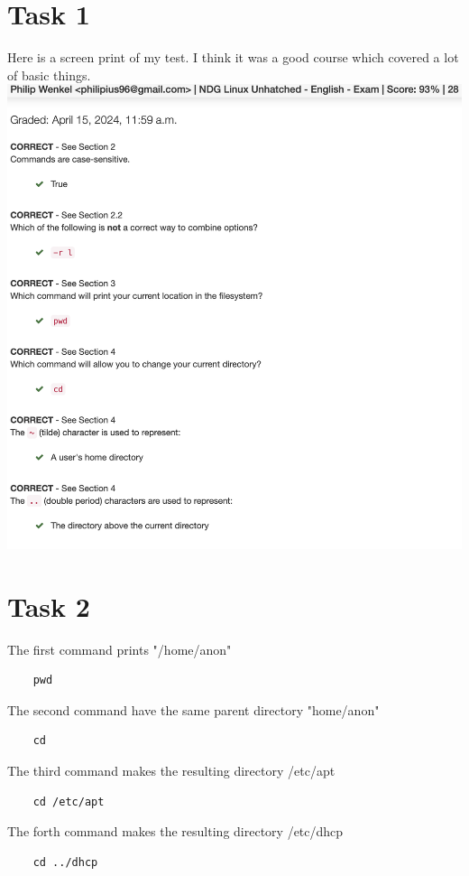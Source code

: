 \documentclass{article}
\begin{document}
\section {Task 1}
Here is a screen print of my test. 
I think it was a good course which covered a lot of basic things.
\includegraphics[width=\textwidth,height=\textheight,keepaspectratio]{quiz}

\section{Task 2}
The first command prints "/home/anon"
\begin{verbatim}
	pwd
\end{verbatim}

The second command have the same parent directory "home/anon"
\begin{verbatim}
	cd
\end{verbatim}

The third command makes the resulting directory /etc/apt
\begin{verbatim}
	cd /etc/apt
\end{verbatim}

The forth command makes the resulting directory /etc/dhcp
\begin{verbatim}
	cd ../dhcp
\end{verbatim}
\end{document}
